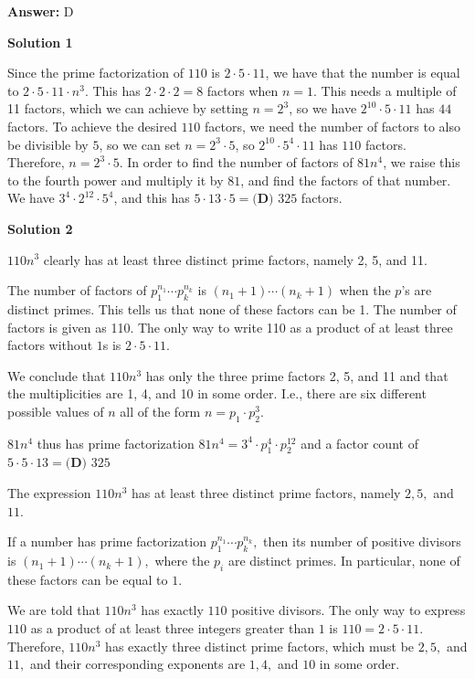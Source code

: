 \begin{enumerate}
 \textbf{Answer: }D



\textbf{Solution 1}

Since the prime factorization of $110$ is $2 \cdot 5 \cdot 11$, we have that the number is equal to $2 \cdot 5 \cdot 11 \cdot n^3$.  This has $2 \cdot 2 \cdot 2=8$ factors when $n=1$.  This needs a multiple of 11 factors, which we can achieve by setting $n=2^3$, so we have $2^{10} \cdot 5 \cdot 11$ has $44$ factors.  To achieve the desired $110$ factors, we need the number of factors to also be divisible by $5$, so we can set $n=2^3 \cdot 5$, so $2^{10} \cdot 5^4 \cdot 11$ has $110$ factors.  Therefore, $n=2^3 \cdot 5$.  In order to find the number of factors of $81n^4$, we raise this to the fourth power and multiply it by $81$, and find the factors of that number.  We have $3^4 \cdot 2^{12} \cdot 5^4$, and this has $5 \cdot 13 \cdot 5=\boxed{\textbf{(D) }325}$ factors.

 



\textbf{Solution 2}

$110n^3$ clearly has at least three distinct prime factors, namely 2, 5, and 11.

 The number of factors of $p_1^{n_1}\cdots p_k^{n_k}$ is $(n_1+1)\cdots(n_k+1)$ when the $p$'s are distinct primes. This tells us that none of these factors can be 1. The number of factors is given as 110. The only way to write 110 as a product of at least three factors without $1$s is $2\cdot 5\cdot 11$.

 We conclude that $110n^3$ has only the three prime factors 2, 5, and 11 and that the multiplicities are 1, 4, and 10 in some order.  I.e., there are six different possible values of $n$ all of the form $n=p_1\cdot p_2^3$.

 $81n^4$ thus has prime factorization $81n^4=3^4\cdot p_1^4\cdot p_2^{12}$ and a factor count of $5\cdot5\cdot13=\boxed{\textbf{(D) }325}$

 The expression $110n^3$ has at least three distinct prime factors, namely $2, 5,$ and $11$.

 If a number has prime factorization $p_1^{n_1}\cdots p_k^{n_k},$ then its number of positive divisors is $(n_1+1)\cdots(n_k+1),$ where the $p_i$ are distinct primes. In particular, none of these factors can be equal to $1$.

 We are told that $110n^3$ has exactly $110$ positive divisors. The only way to express $110$ as a product of at least three integers greater than $1$ is $110 = 2\cdot 5\cdot 11.$ Therefore, $110n^3$ has exactly three distinct prime factors, which must be $2, 5,$ and $11,$ and their corresponding exponents are $1, 4,$ and $10$ in some order.


\end{enumerate}
